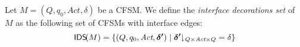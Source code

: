 \begin{definition}\label{def:IDM}
Let $M=(Q,q_0,\textit{Act},\delta)$ be a CFSM. We define the {\em interface decorations set} of $M$
as the following set of CFSMs with interface edges:
$$\mathsf{IDS}\!(M) = \{(Q,q_0,\textit{Act},\bm{\delta'}) \mid \bm{\delta'}\!\!\downharpoonright\!_{Q\times\textit{Act}\times Q} =\delta\}$$
\end{definition}


